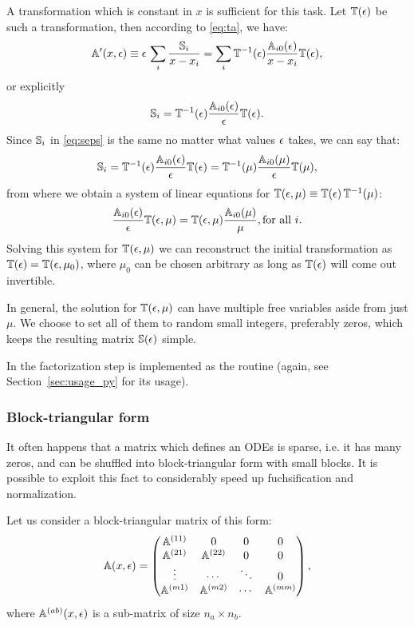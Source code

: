 \documentclass[12pt,a4paper]{article}
\begin{document}
A transformation which is constant in $x$ is sufficient for this task.
Let $\mathbb{T}(\epsilon)$ be such a transformation, then according to \eqref{eq:ta}, we have:
\begin{equation}
  \mathbb{A}'(x,\epsilon) \equiv \epsilon\, \sum_i \frac{\mathbb{S}_i}{x-x_i} = \sum_i \mathbb{T}^{-1}(\epsilon) \frac{\mathbb{A}_{i0}(\epsilon)}{x-x_i} \mathbb{T}(\epsilon),
\end{equation}
or explicitly
\begin{equation}
\label{eq:seps}
  \mathbb{S}_i = \mathbb{T}^{-1}(\epsilon) \frac{\mathbb{A}_{i0}(\epsilon)}{\epsilon} \mathbb{T}(\epsilon).
\end{equation}
Since $\mathbb{S}_i$ in \eqref{eq:seps} is the same no matter what values $\epsilon$ takes, we can say that:
\begin{equation}
  \mathbb{S}_i = \mathbb{T}^{-1}(\epsilon) \frac{\mathbb{A}_{i0}(\epsilon)}{\epsilon} \mathbb{T}(\epsilon) =
    \mathbb{T}^{-1}(\mu) \frac{\mathbb{A}_{i0}(\mu)}{\epsilon} \mathbb{T}(\mu),
\end{equation}
from where we obtain a system of linear equations for $\mathbb{T}(\epsilon,\mu) \equiv \mathbb{T}(\epsilon) \, \mathbb{T}^{-1}(\mu)$:
\begin{equation}
  \frac{\mathbb{A}_{i0}(\epsilon)}{\epsilon} \mathbb{T}(\epsilon,\mu) = \mathbb{T}(\epsilon,\mu) \frac{\mathbb{A}_{i0}(\mu)}{\mu}, \text{for all $i$.}
\end{equation}
Solving this system for $\mathbb{T}(\epsilon,\mu)$ we can reconstruct the initial transformation as $\mathbb{T}(\epsilon) = \mathbb{T}(\epsilon,\mu_0)$, where $\mu_0$ can be chosen arbitrary as long as $\mathbb{T}(\epsilon)$ will come out invertible.

In general, the solution for $\mathbb{T}(\epsilon,\mu)$ can have multiple free variables aside from just $\mu$.
We choose to set all of them to random small integers, preferably zeros, which keeps the resulting matrix $\mathbb{S}(\epsilon)$ simple.

In \fuchsia the factorization step is implemented as the  routine (again, see Section~\ref{sec:usage_py} for its usage).

\subsubsection{Block-triangular form}
\label{sec:blockreduce}

It often happens that a matrix which defines an ODEs is sparse, i.e. it has many zeros, and can be shuffled into block-triangular form with small blocks.
It is possible to exploit this fact to considerably speed up fuchsification and normalization.

Let us consider a block-triangular matrix of this form:
\begin{equation}
\label{eq:bdiag}
\mathbb{A}(x,\epsilon)=
\left(
\begin{matrix}
  \mathbb{A}^{(11)} & 0 & 0 & 0
\\
  \mathbb{A}^{(21)} & \mathbb{A}^{(22)} & 0 & 0
\\
  \vdots & \cdots & \ddots & 0
\\
  \mathbb{A}^{(m1)} & \mathbb{A}^{(m2)} & \cdots & \mathbb{A}^{(mm)}
\end{matrix}
\right),
\end{equation}
where $\mathbb{A}^{(ab)}(x,\epsilon)$ is a sub-matrix of size $n_a \times n_b$.
\end{document}
